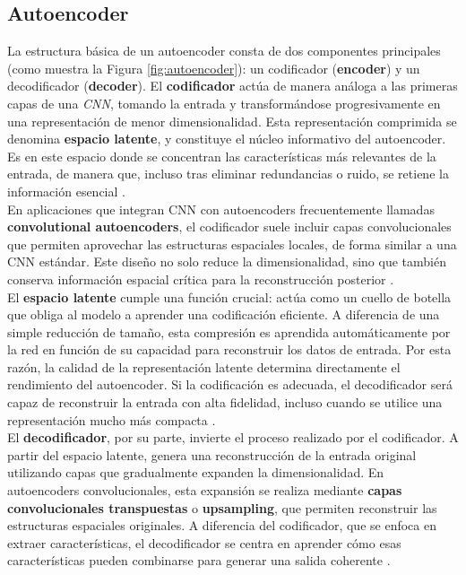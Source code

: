 \documentclass[12pt]{article} %
\begin{document}
\subsection{Autoencoder}
La estructura básica de un autoencoder consta de dos componentes principales (como muestra la Figura \ref{fig:autoencoder}): un codificador (\textbf{encoder}) y un decodificador (\textbf{decoder}). El \textbf{codificador} actúa de manera análoga a las primeras capas de una \textit{CNN}, tomando la entrada y transformándose progresivamente en una representación de menor dimensionalidad. Esta representación comprimida se denomina \textbf{espacio latente}, y constituye el núcleo informativo del autoencoder. Es en este espacio donde se concentran las características más relevantes de la entrada, de manera que, incluso tras eliminar redundancias o ruido, se retiene la información esencial \cite{bank2023autoencoders}. \\

En aplicaciones que integran CNN con autoencoders frecuentemente llamadas \textbf{convolutional autoencoders}, el codificador suele incluir capas convolucionales que permiten aprovechar las estructuras espaciales locales, de forma similar a una CNN estándar. Este diseño no solo reduce la dimensionalidad, sino que también conserva información espacial crítica para la reconstrucción posterior \cite{masci2011stacked}. \\

El \textbf{espacio latente} cumple una función crucial: actúa como un cuello de botella que obliga al modelo a aprender una codificación eficiente. A diferencia de una simple reducción de tamaño, esta compresión es aprendida automáticamente por la red en función de su capacidad para reconstruir los datos de entrada. Por esta razón, la calidad de la representación latente determina directamente el rendimiento del autoencoder. Si la codificación es adecuada, el decodificador será capaz de reconstruir la entrada con alta fidelidad, incluso cuando se utilice una representación mucho más compacta \cite{hinton2006reducing,goodfellow2016deep}. \\

El \textbf{decodificador}, por su parte, invierte el proceso realizado por el codificador. A partir del espacio latente, genera una reconstrucción de la entrada original utilizando capas que gradualmente expanden la dimensionalidad. En autoencoders convolucionales, esta expansión se realiza mediante \textbf{capas convolucionales transpuestas} o \textbf{upsampling}, que permiten reconstruir las estructuras espaciales originales. A diferencia del codificador, que se enfoca en extraer características, el decodificador se centra en aprender cómo esas características pueden combinarse para generar una salida coherente \cite{masci2011stacked}. \\
\end{document}
